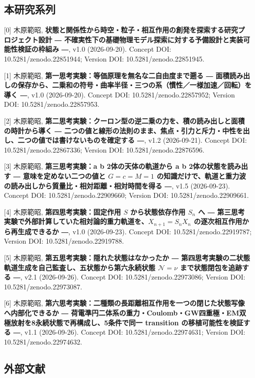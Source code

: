 \documentclass[
  a4paper,
]{ltjsarticle}
\begin{document}
\subsection{本研究系列}\label{ux672cux7814ux7a76ux7cfbux5217}

{[}0{]} 木原範昭,
\textbf{状態と関係性から時空・粒子・相互作用の創発を探索する研究プロジェクト設計
― 不確実性下の基礎物理モデル探索に対する予備設計と実装可能性検証の枠組み
―}, v1.0 (2026-09-20). Concept DOI: 10.5281/zenodo.22851944; Version
DOI: 10.5281/zenodo.22851945.

{[}1{]} 木原範昭, \textbf{第一思考実験：等価原理を無名な二自由度まで遡る
―
面積読み出しの保存から、二乗和の符号・曲率半径・三つの系（慣性／一様加速／回転）を導く
―}, v1.0 (2026-09-20). Concept DOI: 10.5281/zenodo.22857952; Version
DOI: 10.5281/zenodo.22857953.

{[}2{]} 木原範昭,
\textbf{第二思考実験：クーロン型の逆二乗の力を、積の読み出しと面積の時計から導く
―
二つの値と線形の法則のまま、焦点・引力と斥力・中性を出し、二つの値では書けないものを確定する
―}, v1.2 (2026-09-21). Concept DOI: 10.5281/zenodo.22867336; Version
DOI: 10.5281/zenodo.22876596.

{[}3{]} 木原範昭, \textbf{第三思考実験：a b 2体の天体の軌道から a b
2体の状態を読み出す ― 意味を定めない二つの値と \(G=c=M=1\)
の知識だけで、軌道と重力波の読み出しから質量比・相対距離・相対時間を得る
―}, v1.5 (2026-09-23). Concept DOI: 10.5281/zenodo.22909660; Version
DOI: 10.5281/zenodo.22909661.

{[}4{]} 木原範昭, \textbf{第四思考実験：固定作用 \(S\) から状態依存作用
\(S_n\) へ ―
第三思考実験で外部計算していた相対論的重力軌道を、\(X_{n+1}=S_nX_n\)
の逐次相互作用から再生成できるか ―}, v1.0 (2026-09-23). Concept DOI:
10.5281/zenodo.22919787; Version DOI: 10.5281/zenodo.22919788.

{[}5{]} 木原範昭, \textbf{第五思考実験：隠れた状態はなかったか ―
第四思考実験の二状態軌道生成を自己監査し、五状態から第六永続状態
\(\mathcal N=\nu\) まで状態閉包を追跡する ―}, v2.1 (2026-09-26). Concept
DOI: 10.5281/zenodo.22973086; Version DOI: 10.5281/zenodo.22973087.

{[}6{]} 木原範昭,
\textbf{第六思考実験：二種類の長距離相互作用を一つの閉じた状態写像へ内部化できるか
―
荷電準円二体系の重力・Coulomb・GW四重極・EM双極放射を8永続状態で再構成し、5条件で同一
transition の移植可能性を検証する ―}, v1.1 (2026-09-26). Concept DOI:
10.5281/zenodo.22974631; Version DOI: 10.5281/zenodo.22974632.

\subsection{外部文献}\label{ux5916ux90e8ux6587ux732e}
\end{document}
